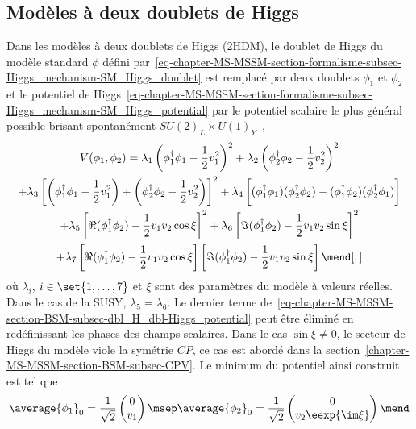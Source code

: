 \subsection{Modèles à deux doublets de Higgs}\label{chapter-MS-MSSM-section-BSM-subsec-dbl_H_dbl}
Dans les modèles à deux doublets de Higgs (2HDM),
le doublet de Higgs du modèle standard $\phi$ défini par~\eqref{eq-chapter-MS-MSSM-section-formalisme-subsec-Higgs_mechanism-SM_Higgs_doublet}
est remplacé par deux doublets $\phi_1$ et $\phi_2$
et
le potentiel de Higgs~\eqref{eq-chapter-MS-MSSM-section-formalisme-subsec-Higgs_mechanism-SM_Higgs_potential}
par
le potentiel scalaire le plus général possible brisant spontanément $SU(2)_L \times U(1)_Y$~\cite{Higgs_hunter_guide,Higgs_hunter_guide_errata},
\begin{multline}
V(\phi_1,\phi_2)
= \lambda_1 \left(\phi_1^\dagger\phi_1 - \frac{1}{2} v_1^2\right)^2
+ \lambda_2 \left(\phi_2^\dagger\phi_2 - \frac{1}{2} v_2^2\right)^2
\\
+ \lambda_3 \left[ \left(\phi_1^\dagger\phi_1 - \frac{1}{2} v_1^2\right) + \left(\phi_2^\dagger\phi_2 - \frac{1}{2} v_2^2\right) \right]^2
+ \lambda_4 \left[ (\phi_1^\dagger\phi_1)(\phi_2^\dagger\phi_2) - (\phi_1^\dagger\phi_2)(\phi_2^\dagger\phi_1) \vphantom{\frac{1}{2}}\right]
\\
+ \lambda_5 \left[ \Re(\phi_1^\dagger\phi_2) - \frac{1}{2} v_1v_2\cos\xi \right]^2
+ \lambda_6 \left[ \Im(\phi_1^\dagger\phi_2) - \frac{1}{2} v_1v_2\sin\xi \right]^2
\\
+ \lambda_7 \left[ \Re(\phi_1^\dagger\phi_2) - \frac{1}{2} v_1v_2\cos\xi \right]\left[ \Im(\phi_1^\dagger\phi_2) - \frac{1}{2} v_1v_2\sin\xi \right]
\mend[,]
\label{eq-chapter-MS-MSSM-section-BSM-subsec-dbl_H_dbl-Higgs_potential}
\end{multline}
où $\lambda_i$, $i\in\set{1,\ldots,7}$ et $\xi$ sont des paramètres du modèle à valeurs réelles.
Dans le cas de la SUSY, $\lambda_5=\lambda_6$.
Le dernier terme de~\eqref{eq-chapter-MS-MSSM-section-BSM-subsec-dbl_H_dbl-Higgs_potential} peut être éliminé en redéfinissant les phases des champs scalaires.
Dans le cas $\sin\xi\neq0$, le secteur de Higgs du modèle viole la symétrie $CP$,
ce cas est abordé dans la section~\ref{chapter-MS-MSSM-section-BSM-subsec-CPV}.
Le minimum du potentiel ainsi construit est tel que
\begin{equation}
\average{\phi_1}_0 = \frac{1}{\sqrt{2}} \begin{pmatrix}
0\\v_1
\end{pmatrix}
\msep
\average{\phi_2}_0 = \frac{1}{\sqrt{2}} \begin{pmatrix}
0\\v_2 \eexp{\im\xi}
\end{pmatrix}
\mend
\end{equation}
